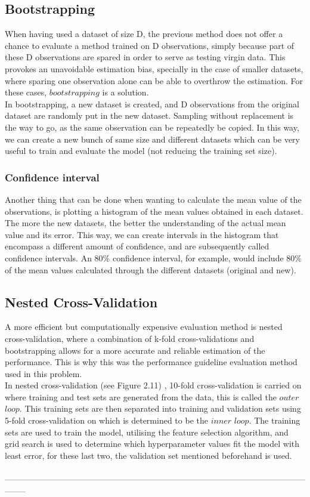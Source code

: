 \subsection{Bootstrapping}
When having used a dataset of size D, the previous method does not offer a chance to evaluate a method trained on D observations, simply because part of these D observations are spared in order to serve as testing virgin data. This provokes an unavoidable estimation bias, specially in the case of smaller datasets, where sparing one observation alone can be able to overthrow the estimation. For these cases, $bootstrapping$ is a solution.\\

In bootstrapping, a new dataset is created, and D observations from the original dataset are randomly put in the new dataset. Sampling without replacement is the way to go, as the same observation can be repeatedly be copied. In this way, we can create a new bunch of same size and different datasets which can be very useful to train and evaluate the model (not reducing the training set size).

\subsubsection{Confidence interval}
Another thing that can be done when wanting to calculate the mean value of the observations, is plotting a histogram of the mean values obtained in each dataset. The more the new datasets, the better the understanding of the actual mean value and its error. This way, we can create intervals in the histogram that encompass a different amount of confidence, and are subsequently called confidence intervals. An 80\% confidence interval, for example, would include 80\% of the mean values calculated through the different datasets (original and new). 

\subsection{Nested Cross-Validation}
A more efficient but computationally expensive evaluation method is nested cross-validation, where a combination of k-fold cross-validations and bootstrapping allows for a more accurate and reliable estimation of the performance. This is why this was the performance guideline evaluation method used in this problem.\\

In nested cross-validation (see Figure 2.11) , 10-fold cross-validation is carried on where training and test sets are generated from the data, this is called the $outer$ $loop$. This training sets are then separated into training and validation sets using 5-fold cross-validation on which is determined to be the $inner$ $loop$. The training sets are used to train the model, utilising the feature selection algorithm, and grid search is used to determine which hyperparameter values fit the model with least error, for these last two, the validation set mentioned beforehand is used.\\\\ 
--------------------------------------------------------------------------------------------------------------------
